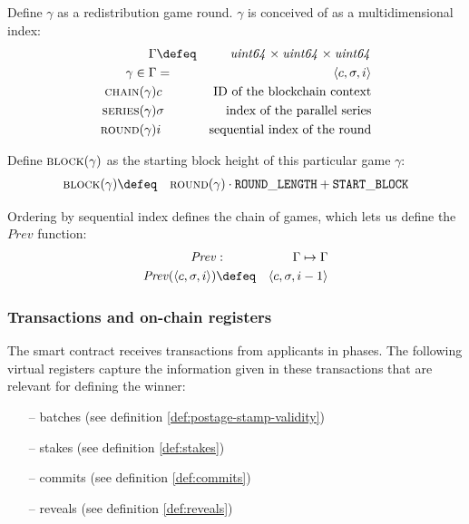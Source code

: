 \begin{definition}

\label{def:redistribution-game-round} 
Define $\gamma$ as a redistribution game round.  $\gamma$ is conceived of as a multidimensional index:
%
\begin{eqnarray}
\Gamma&\defeq&\mathit{uint64}\times\mathit{uint64}\times\mathit{uint64}\\
\gamma\in\Gamma&=&\langle c,\sigma,i\rangle\\
\textsc{chain}(\gamma)&c&\text{ID of the blockchain context}\\
\textsc{series}(\gamma)&\sigma&\text{index of the parallel series}\\
\textsc{round}(\gamma)&i&\text{sequential index of the round}
\end{eqnarray}

Define $\textsc{block}(\gamma)$ as the starting block height of this particular game $\gamma$:
%
\begin{eqnarray}
\textsc{block}(\gamma)&\defeq&\textsc{round}(\gamma)\cdot \mathtt{ROUND\_LENGTH}+\mathtt{START\_BLOCK}
\end{eqnarray}

Ordering by sequential index defines the chain of games, which lets us define the $\mathit{Prev}$ function:
%
\begin{eqnarray}
\mathit{Prev}&:&\Gamma\mapsto\Gamma\\
\mathit{Prev}(\langle c,\sigma,i\rangle)&\defeq&\langle c,\sigma,i-1\rangle
\end{eqnarray}
\end{definition}

\subsubsection{Transactions and on-chain registers}

The smart contract receives transactions from applicants in phases. The following virtual registers capture the information given in these transactions that are relevant for defining the winner:
\begin{itemize}[noitemsep]
\item[--] batches (see definition \ref{def:postage-stamp-validity})
\item[--] stakes (see definition \ref{def:stakes})
\item[--] commits (see definition \ref{def:commits})
\item[--] reveals (see definition \ref{def:reveals})
\end{itemize}


